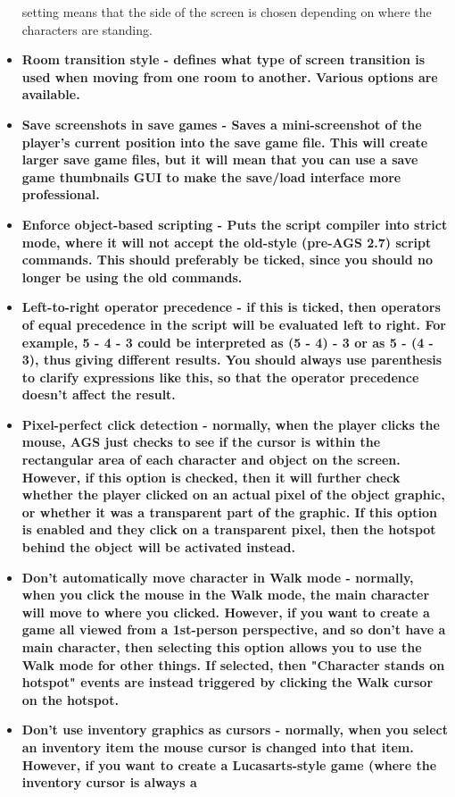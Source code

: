 \begin{itemize}
setting means that the side of the screen is chosen depending on where the characters are
standing.
\item \bf{Room transition style} - defines what type of screen transition is used when
moving from one room to another. Various options are available.
\item \bf{Save screenshots in save games} - Saves a mini-screenshot of the player's current
position into the save game file. This will create larger save game files, but it will
mean that you can use a save game thumbnails GUI to make the save/load interface
more professional.
\item \bf{Enforce object-based scripting} - Puts the script compiler into strict mode,
where it will not accept the old-style (pre-AGS 2.7) script commands. This should
preferably be ticked, since you should no longer be using the old commands.
\item \bf{Left-to-right operator precedence} - if this is ticked, then operators of
equal precedence in the script will be evaluated left to right. For example,
5 - 4 - 3 could be interpreted as  (5 - 4) - 3  or as  5 - (4 - 3), thus giving
different results. You should always use parenthesis to clarify expressions like this,
so that the operator precedence doesn't affect the result.
\item \bf{Pixel-perfect click detection} - normally, when the player clicks the
mouse, AGS just checks to see if the cursor is within the rectangular area
of each character and object on the screen. However, if this option is
checked, then it will further check whether the player clicked on an actual
pixel of the object graphic, or whether it was a transparent part of the
graphic. If this option is enabled and they click on a transparent pixel,
then the hotspot behind the object will be activated instead.
\item \bf{Don't automatically move character in Walk mode} - normally, when you click the mouse in
the Walk mode, the main character will move to where you clicked. However,
if you want to create a game all viewed from a 1st-person perspective, and
so don't have a main character, then selecting this option allows you to
use the Walk mode for other things. If selected, then "Character stands on
hotspot" events are instead triggered by clicking the Walk cursor on the
hotspot.
\item \bf{Don't use inventory graphics as cursors} - normally, when you select an inventory
item the mouse cursor is changed into that item. However, if you want to
create a Lucasarts-style game (where the inventory cursor is always a

\end{itemize}
